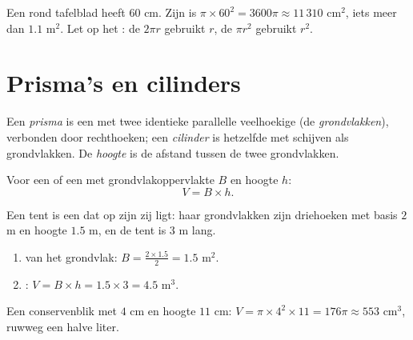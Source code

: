 \begin{example}\label{ex:g7:areas:disk}
Een rond tafelblad heeft  $60$ cm. Zijn  is
$\pi \times 60^2 = 3600\pi \approx 11\,310$ cm$^2$, iets meer dan $1.1$ m$^2$. Let
op het : de \emph{} $2\pi r$ gebruikt $r$, de \emph{}
$\pi r^2$ gebruikt $r^2$.
\end{example}

\section{Prisma's en cilinders}

\begin{definition}\label{def:g7:areas:prism}
Een \emph{prisma} is een  met twee identieke parallelle
veelhoekige  (de \emph{grondvlakken}), verbonden door rechthoeken; een
\emph{cilinder} is hetzelfde met schijven als grondvlakken. De
\emph{hoogte} is de afstand tussen de twee grondvlakken.
\end{definition}

\begin{theorem}[Volumes]\label{thm:g7:areas:volume}
Voor een  of een  met grondvlakoppervlakte $B$ en hoogte $h$:
\[
V = B \times h .
\]
\end{theorem}
\admitted

\begin{example}\label{ex:g7:areas:volume}
Een tent is een  dat op zijn zij ligt: haar grondvlakken zijn driehoeken met
basis $2$ m en hoogte $1.5$ m, en de tent is $3$ m lang.
\begin{enumerate}
  \item {} van het grondvlak: $B = \frac{2 \times 1.5}{2} = 1.5$ m$^2$.
  \item {}: $V = B \times h = 1.5 \times 3 = 4.5$ m$^3$.
\end{enumerate}
Een conservenblik met  $4$ cm en hoogte $11$ cm:
$V = \pi \times 4^2 \times 11 = 176\pi \approx 553$ cm$^3$, ruwweg een halve liter.
\end{example}

